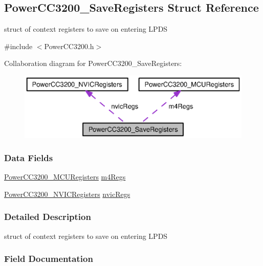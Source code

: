 \subsection{Power\+C\+C3200\+\_\+\+Save\+Registers Struct Reference}
\label{struct_power_c_c3200___save_registers}


struct of context registers to save on entering L\+P\+D\+S  




{\ttfamily \#include $<$Power\+C\+C3200.\+h$>$}



Collaboration diagram for Power\+C\+C3200\+\_\+\+Save\+Registers\+:
\nopagebreak
\begin{figure}[H]
\begin{center}
\leavevmode
\includegraphics[width=350pt]{struct_power_c_c3200___save_registers__coll__graph}
\end{center}
\end{figure}
\subsubsection*{Data Fields}
\begin{DoxyCompactItemize}
\item 
\hyperlink{struct_power_c_c3200___m_c_u_registers}{Power\+C\+C3200\+\_\+\+M\+C\+U\+Registers} \hyperlink{struct_power_c_c3200___save_registers_a94901ff1c1321554292e8cc85a3299b8}{m4\+Regs}
\item 
\hyperlink{struct_power_c_c3200___n_v_i_c_registers}{Power\+C\+C3200\+\_\+\+N\+V\+I\+C\+Registers} \hyperlink{struct_power_c_c3200___save_registers_a1880ad32c749419af188547e05bcbef9}{nvic\+Regs}
\end{DoxyCompactItemize}


\subsubsection{Detailed Description}
struct of context registers to save on entering L\+P\+D\+S 

\subsubsection{Field Documentation}
